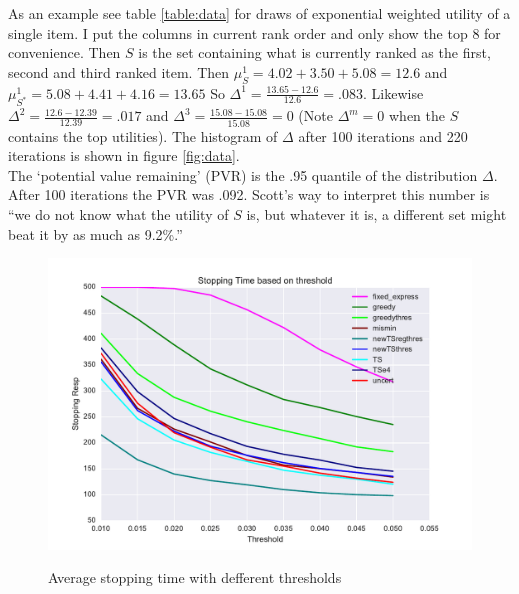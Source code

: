 \documentclass[nonblindrev]{informs3}
\begin{document}
As an example see table \ref{table:data} for draws of exponential weighted utility of a single item. I put the columns in current rank order and only show the top 8 for convenience. Then $S$ is the set containing what is currently ranked as the first, second and third ranked item. Then $\mu^1_{S}=4.02+3.50+5.08=12.6$ and $\mu_{S^*}^{1}=5.08+4.41+4.16=13.65$ So $\Delta^{1}=\frac{13.65-12.6}{12.6}=.083$. Likewise $\Delta^{2}=\frac{12.6-12.39}{12.39}=.017$ and $\Delta^{3}=\frac{15.08-15.08}{15.08}=0$ (Note $\Delta^m=0$ when the $S$ contains the top utilities). The histogram of $\Delta$ after 100 iterations and 220 iterations is shown in figure \ref{fig:data}. \\
 The `potential value remaining' (PVR) is the .95 quantile of the distribution $\Delta$. After 100 iterations the PVR was .092. Scott's way to interpret this number is ``we do not know what the utility of $S$ is, but whatever it is, a different set might beat it by as much as 9.2\%.''\\

\begin{figure}
\caption{Average stopping time with defferent thresholds}
\includegraphics[width=1\textwidth]{plots/stoppingtimes.pdf}
\label{fig:st}
\end{figure}
\end{document}
